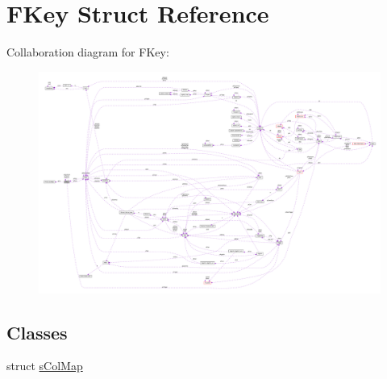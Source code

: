 \hypertarget{structFKey}{}\section{F\+Key Struct Reference}
\label{structFKey}


Collaboration diagram for F\+Key\+:\nopagebreak
\begin{figure}[H]
\begin{center}
\leavevmode
\includegraphics[width=350pt]{structFKey__coll__graph}
\end{center}
\end{figure}
\subsection*{Classes}
\begin{DoxyCompactItemize}
\item 
struct \hyperlink{structFKey_1_1sColMap}{s\+Col\+Map}
\end{DoxyCompactItemize}
